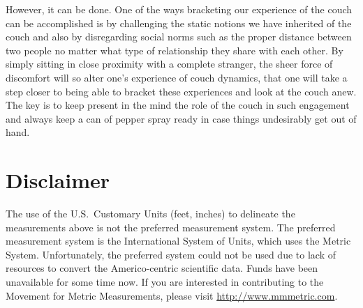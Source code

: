 \documentclass[12pt]{article}
\begin{document}
However, it can be done. One of the ways bracketing our experience
of the couch can be accomplished is by challenging the static
notions we have inherited of the couch and also by disregarding
social norms such as the proper distance between two people no
matter what type of relationship they share with each other. By
simply sitting in close proximity with a complete stranger, the
sheer force of discomfort will so alter one's experience of couch
dynamics, that one will take a step closer to being able to
bracket these experiences and look at the couch anew. The key is
to keep present in the mind the role of the couch in such
engagement and always keep a can of pepper spray ready in case
things undesirably get out of hand.


\section{Disclaimer}

The use of the U.S.\ Customary Units (feet, inches) to delineate
the measurements above is not the preferred measurement system.
The preferred measurement system is the International System of
Units, which uses the Metric System. Unfortunately, the preferred
system could not be used due to lack of resources to convert the
Americo-centric scientific data. Funds have been unavailable for
some time now. If you are interested in contributing to the
Movement for Metric Measurements, please visit
\url{http://www.mmmetric.com}.
\end{document}
